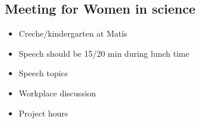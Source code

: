 \subsection{Meeting for Women in science}
\label{task:20180206_cj1}

\begin{itemize}
\item Creche/kindergarten at Matís
\item Speech should be 15/20 min during lunch time
\item Speech topics
\item Workplace discussion
\item Project hours
\end{itemize}

